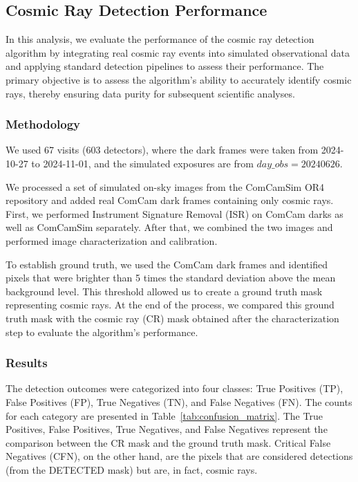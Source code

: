 \subsection{Cosmic Ray Detection Performance}

In this analysis, we evaluate the performance of the cosmic ray detection algorithm by integrating real cosmic ray events into simulated observational data and applying standard detection pipelines to assess their performance. The primary objective is to assess the algorithm's ability to accurately identify cosmic rays, thereby ensuring data purity for subsequent scientific analyses.

\subsubsection{Methodology}

We used 67 visits (603 detectors), where the dark frames were taken from 2024-10-27 to 2024-11-01, and the simulated exposures are from $day\_obs=20240626$.

We processed a set of simulated on-sky images from the ComCamSim OR4 repository and added real ComCam dark frames containing only cosmic rays. First, we performed Instrument Signature Removal (ISR) on ComCam darks as well as ComCamSim separately. After that, we combined the two images and performed image characterization and calibration.

To establish ground truth, we used the ComCam dark frames and identified pixels that were brighter than 5 times the standard deviation above the mean background level. This threshold allowed us to create a ground truth mask representing cosmic rays. At the end of the process, we compared this ground truth mask with the cosmic ray (CR) mask obtained after the characterization step to evaluate the algorithm's performance.

\subsubsection{Results}

The detection outcomes were categorized into four classes: True Positives (TP), False Positives (FP), True Negatives (TN), and False Negatives (FN). The counts for each category are presented in Table~\ref{tab:confusion_matrix}. The True Positives, False Positives, True Negatives, and False Negatives represent the comparison between the CR mask and the ground truth mask. Critical False Negatives (CFN), on the other hand, are the pixels that are considered detections (from the DETECTED mask) but are, in fact, cosmic rays.

